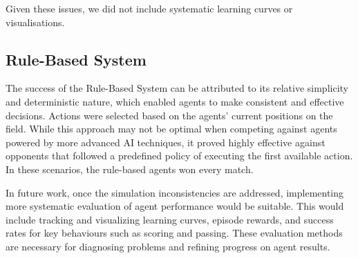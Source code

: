 Given these issues, we did not include systematic learning curves or visualisations.

\subsection{Rule-Based System}
The success of the Rule-Based System can be attributed to its relative simplicity and deterministic nature, which enabled agents to make consistent and effective decisions. Actions were selected based on the agents' current positions on the field. While this approach may not be optimal when competing against agents powered by more advanced AI techniques, it proved highly effective against opponents that followed a predefined policy of executing the first available action. In these scenarios, the rule-based agents won every match.

In future work, once the simulation inconsistencies are addressed, implementing more systematic evaluation of agent performance would be suitable. This would include tracking and visualizing learning curves, episode rewards, and success rates for key behaviours such as scoring and passing. These evaluation methods are necessary for diagnosing problems and refining progress on agent results.
